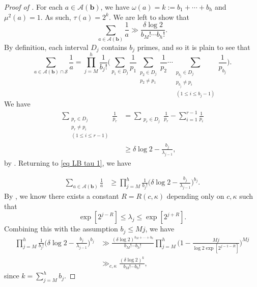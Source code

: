 \documentclass{amsart}
\theoremstyle{definition}
\numberwithin{equation}{section}
\renewcommand{\S}{\mathcal{S}}
\newcommand{\density}{\delta}
\begin{document}
	\begin{proof}[Proof of ]
		For each $a \in \mathscr{A}(\bm{b})$, we have $\omega(a) = k := b_1 + \cdots +b_h$ and $\mu^2(a) = 1$. As such, $\tau(a) = 2^k$. We are left to show that
		$$\sum_{a \in \mathscr{A}(\bm{b}) } \frac{1}{a} \gg \frac{\density \log 2}{b_M! \cdots b_h!}.$$
		By definition, each interval $D_j$ contains $b_j$ primes, and so it is plain to see that
		\begin{equation}\label{eq LB tau 1}
			\sum_{a \in \mathscr{A}(\bm{b}) \cap \S} \frac{1}{a} = \prod_{j = M}^h \frac{1}{b_j!}\bigg(\sum_{p_1 \in D_j}\frac{1}{p_1} \sum_{\substack{p_2 \in D_j \\ p_2 \ne p_1}}\frac{1}{p_2} \cdots \sum_{\substack{p_{b_j}\in D_j \\ p_{b_j} \ne p_i\\(1 \leq i \leq b_j-1)}}\frac{1}{p_{b_j}}\bigg).
		\end{equation}
		We have
		\begin{align*}
			\sum_{\substack{p_{r}\in D_j \\ p_{r} \ne p_i\\(1 \leq i \leq r-1)}}\frac{1}{p_{r}} &= \sum_{\substack{p_{r}\in D_j}}\frac{1}{p_{r}} - \sum_{i = 1}^{r-1}\frac{1}{p_{i}}\\
			&\geq \density \log 2 - \frac{b_j}{\lambda_{j-1}},
		\end{align*}
		by . Returning to \eqref{eq LB tau 1}, we have
		
		\begin{align*}
		\sum_{a \in \mathscr{A}(\bm{b}) } \frac{1}{a} &\geq \prod_{j = M}^h \frac{1}{b_j!}\bigg(\density \log 2 - \frac{b_j}{\lambda_{j-1}}\bigg)^{b_j}.
		\end{align*}
		By , we know there exists a constant $R=R(c,\kappa)$ depending only on $c,\kappa$ such that
		$$\exp{[2^{j-R}]} \leq \lambda_j \leq \exp{[2^{j+R}]}.$$
		 Combining this with the assumption $b_j \leq M j$, we have 
		 \begin{align*}
		 	\prod_{j = M}^h \frac{1}{b_j!}\bigg(\density \log 2 - \frac{b_j}{\lambda_{j-1}}\bigg)^{b_j} &\gg \frac{(\density \log 2)^{b_M + \cdots +b_h}}{b_M! \cdots b_h !} \prod_{j = M}^h \bigg(1 - \frac{M j}{\log 2 \exp[2^{j-1-R}]}\bigg)^{M j}\\
		 	&\gg_{c,\kappa} \frac{(\density \log 2)^{k}}{b_M! \cdots b_h !},
		 \end{align*}
		 since $k = \sum_{j = M}^h b_j$.
	\end{proof}
	
\end{document}
